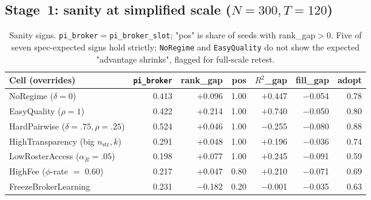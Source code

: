 \documentclass[11pt,a4paper]{article}
\begin{document}
\subsection{Stage~1: sanity at simplified scale ($N{=}300, T{=}120$)}
\begin{table}[h]\centering\small
\caption{Sanity signs. \texttt{pi\_broker}$={}$\texttt{pi\_broker\_slot}; "pos" is share of seeds with rank\_gap$>$0. Five of seven spec-expected signs hold strictly; \texttt{NoRegime} and \texttt{EasyQuality} do not show the expected "advantage shrinks", flagged for full-scale retest.}
\label{tab:sanity}
\begin{tabular}{@{}lrrrrrr@{}}
\toprule
Cell (overrides) & \texttt{pi\_broker} & rank\_gap & pos & $R^2$\_gap & fill\_gap & adopt\\
\midrule
NoRegime ($\delta{=}0$)                       & 0.413 & $+$0.096 & 1.00 & $+$0.447 & $-$0.054 & 0.78 \\
EasyQuality ($\rho{=}1$)                      & 0.422 & $+$0.214 & 1.00 & $+$0.740 & $-$0.050 & 0.80 \\
HardPairwise ($\delta{=}.75,\rho{=}.25$)      & 0.524 & $+$0.046 & 1.00 & $-$0.255 & $-$0.080 & 0.88 \\
HighTransparency (big $n_\text{str},k$)        & 0.291 & $+$0.048 & 1.00 & $+$0.196 & $-$0.036 & 0.74 \\
LowRosterAccess ($\alpha_R{=}.05$)             & 0.198 & $+$0.077 & 1.00 & $+$0.245 & $-$0.091 & 0.59 \\
HighFee ($\phi$-rate $=$ 0.60)                 & 0.217 & $+$0.047 & 0.80 & $+$0.210 & $-$0.071 & 0.69 \\
FreezeBrokerLearning                           & 0.231 & $-$0.182 & 0.20 & $-$0.001 & $-$0.035 & 0.63 \\
\bottomrule
\end{tabular}
\end{table}
\end{document}
